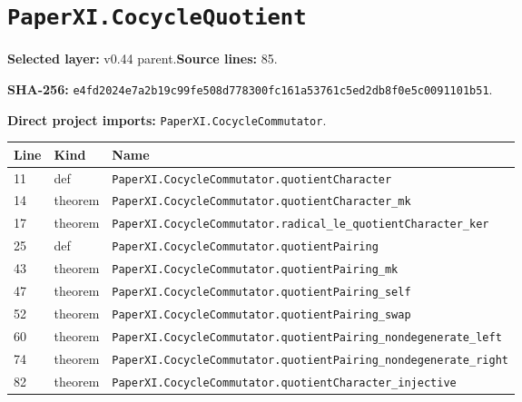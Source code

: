 \documentclass[10pt,oneside]{book}
\begin{document}
\section{\texorpdfstring{\nolinkurl{PaperXI.CocycleQuotient}}{PaperXI.CocycleQuotient}}\label{module:PaperXI.CocycleQuotient}

\textbf{Selected layer:} v0.44 parent.\quad\textbf{Source lines:} 85.\par\textbf{SHA-256:} {\scriptsize\nolinkurl{e4fd2024e7a2b19c99fe508d778300fc161a53761c5ed2db8f0e5c0091101b51}}.


\textbf{Direct project imports:} \nolinkurl{PaperXI.CocycleCommutator}.

\begin{longtable}{@{}p{}p{}p{}@{}}\toprule Line&Kind&Name\\\midrule\endhead

11&def&\nolinkurl{PaperXI.CocycleCommutator.quotientCharacter}\\

14&theorem&\nolinkurl{PaperXI.CocycleCommutator.quotientCharacter_mk}\\

17&theorem&\nolinkurl{PaperXI.CocycleCommutator.radical_le_quotientCharacter_ker}\\

25&def&\nolinkurl{PaperXI.CocycleCommutator.quotientPairing}\\

43&theorem&\nolinkurl{PaperXI.CocycleCommutator.quotientPairing_mk}\\

47&theorem&\nolinkurl{PaperXI.CocycleCommutator.quotientPairing_self}\\

52&theorem&\nolinkurl{PaperXI.CocycleCommutator.quotientPairing_swap}\\

60&theorem&\nolinkurl{PaperXI.CocycleCommutator.quotientPairing_nondegenerate_left}\\

74&theorem&\nolinkurl{PaperXI.CocycleCommutator.quotientPairing_nondegenerate_right}\\

82&theorem&\nolinkurl{PaperXI.CocycleCommutator.quotientCharacter_injective}\\

\bottomrule\end{longtable}
\end{document}
